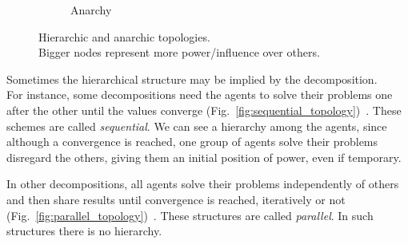\documentclass[../main.tex]{subfiles}
\begin{document}
\begin{figure}[h]
\begin{subfigure}[b]{.45\textwidth}
{
  }
  \caption{Anarchy}\label{fig:anarchy_topology}
\end{subfigure}
\caption[Hierarchic and anarchic topologies.]{Hierarchic and anarchic topologies. \\Bigger nodes represent more power/influence over others.}\label{fig:hierarchic_anarchic}
\end{figure}

Sometimes the hierarchical structure may be implied by the decomposition.
\\For instance, some decompositions need the agents to solve their problems one after the other until the values converge (Fig.~\ref{fig:sequential_topology})~\cite{LiuEtAl2009a}.
These schemes are called \emph{sequential}.
We can see a hierarchy among the agents, since although a convergence is reached, one group of agents solve their problems disregard the others, giving them an initial position of power, even if temporary.

In other decompositions, all agents solve their problems independently of others and then share results until convergence is reached, iteratively or not (Fig.~\ref{fig:parallel_topology})~\cite{LiuEtAl2010}.
These structures are called \emph{parallel}.
In such structures there is no hierarchy.
\end{document}
